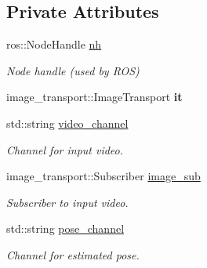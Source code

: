 \subsection*{Private Attributes}
\begin{DoxyCompactItemize}
\item 
\mbox{\label{classImageProcessor_a5881b13aaa2f4221995e1feffc5926f4}} 
ros\+::\+Node\+Handle \hyperlink{classImageProcessor_a5881b13aaa2f4221995e1feffc5926f4}{nh}
\begin{DoxyCompactList}\small\item\em Node handle (used by R\+OS) \end{DoxyCompactList}\item 
\mbox{\label{classImageProcessor_a5a50b4f4f51f84d2cfb783bb72b3f353}} 
image\+\_\+transport\+::\+Image\+Transport {\bfseries it}
\item 
\mbox{\label{classImageProcessor_a8d8738a4c260ca625d5b37cfa1421a8e}} 
std\+::string \hyperlink{classImageProcessor_a8d8738a4c260ca625d5b37cfa1421a8e}{video\+\_\+channel}
\begin{DoxyCompactList}\small\item\em Channel for input video. \end{DoxyCompactList}\item 
\mbox{\label{classImageProcessor_aa968e5f3f146cb0a2a714fddac92bdb1}} 
image\+\_\+transport\+::\+Subscriber \hyperlink{classImageProcessor_aa968e5f3f146cb0a2a714fddac92bdb1}{image\+\_\+sub}
\begin{DoxyCompactList}\small\item\em Subscriber to input video. \end{DoxyCompactList}\item 
\mbox{\label{classImageProcessor_a426d7131b95f7c9c6bd7bd88a9babd43}} 
std\+::string \hyperlink{classImageProcessor_a426d7131b95f7c9c6bd7bd88a9babd43}{pose\+\_\+channel}
\begin{DoxyCompactList}\small\item\em Channel for estimated pose. \end{DoxyCompactList}\item 
\mbox{\label{classImageProcessor_acec03fa90dcfe504222c82ae2f3c30a4}} 

\end{DoxyCompactItemize}
